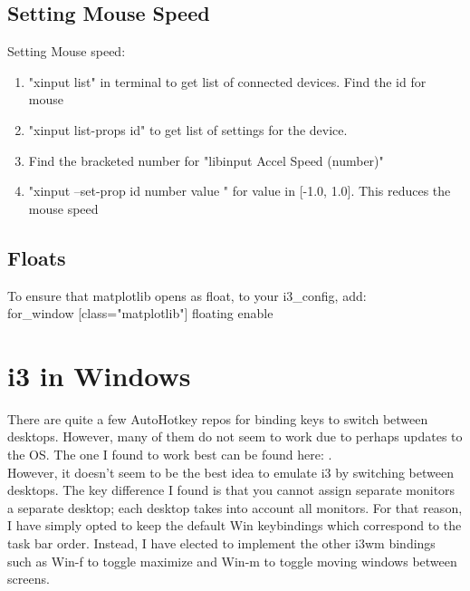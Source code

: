 \subsection{Setting Mouse Speed}
Setting Mouse speed:
\begin{enumerate}
    \item "xinput list" in terminal to get list of connected devices. Find the id for mouse
    \item "xinput list-props \tlangle id\trangle" to get list of settings for the device.
    \item Find the bracketed number for "libinput Accel Speed (\tlangle number\trangle)"
    \item "xinput --set-prop \tlangle id \trangle \tlangle number \trangle
        \tlangle value \trangle" for value in [-1.0, 1.0]. This reduces the mouse speed
\end{enumerate}

\subsection{Floats}
To ensure that matplotlib opens as float, to your i3\_config, add:\\

for\_window [class="matplotlib"] floating enable\\

\section{i3 in Windows}
There are quite a few AutoHotkey repos for binding keys to switch between
desktops. However, many of them do not seem to work due to perhaps updates to
the OS. The one I found to work best can be found here:
\cite{pmb6tz2020windows}.\\

However, it doesn't seem to be the best idea to emulate i3 by switching between
desktops. The key difference I found is that you cannot assign separate monitors
a separate desktop; each desktop takes into account all monitors. For that
reason, I have simply opted to keep the default Win keybindings which correspond
to the task bar order. Instead, I have elected to implement the other i3wm
bindings such as Win-f to toggle maximize and Win-m to toggle moving windows
between screens.\\

